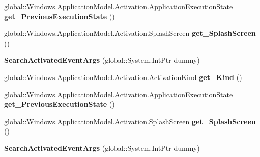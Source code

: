 \begin{DoxyCompactItemize}
global\+::\+Windows.\+Application\+Model.\+Activation.\+Application\+Execution\+State {\bfseries get\+\_\+\+Previous\+Execution\+State} ()
\item 
\mbox{\label{class_windows_1_1_application_model_1_1_activation_1_1_search_activated_event_args_a7bb7e56771d1d46337355c17b4369b92}} 
global\+::\+Windows.\+Application\+Model.\+Activation.\+Splash\+Screen {\bfseries get\+\_\+\+Splash\+Screen} ()
\item 
\mbox{\label{class_windows_1_1_application_model_1_1_activation_1_1_search_activated_event_args_aea1c8ddcb207b9f98acf647773786b5f}} 
{\bfseries Search\+Activated\+Event\+Args} (global\+::\+System.\+Int\+Ptr dummy)
\item 
\mbox{\label{class_windows_1_1_application_model_1_1_activation_1_1_search_activated_event_args_ae745f93bbbb9f56dc031cdb191ee965f}} 
global\+::\+Windows.\+Application\+Model.\+Activation.\+Activation\+Kind {\bfseries get\+\_\+\+Kind} ()
\item 
\mbox{\label{class_windows_1_1_application_model_1_1_activation_1_1_search_activated_event_args_a9abe0a792ef91c56e434e48928763f23}} 
global\+::\+Windows.\+Application\+Model.\+Activation.\+Application\+Execution\+State {\bfseries get\+\_\+\+Previous\+Execution\+State} ()
\item 
\mbox{\label{class_windows_1_1_application_model_1_1_activation_1_1_search_activated_event_args_a7bb7e56771d1d46337355c17b4369b92}} 
global\+::\+Windows.\+Application\+Model.\+Activation.\+Splash\+Screen {\bfseries get\+\_\+\+Splash\+Screen} ()
\item 
\mbox{\label{class_windows_1_1_application_model_1_1_activation_1_1_search_activated_event_args_aea1c8ddcb207b9f98acf647773786b5f}} 
{\bfseries Search\+Activated\+Event\+Args} (global\+::\+System.\+Int\+Ptr dummy)

\end{DoxyCompactItemize}
